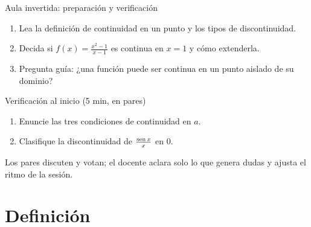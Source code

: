 \documentclass[10pt,aspectratio=169]{beamer}
\begin{document}
\begin{frame}{Aula invertida: preparación y verificación}
  \small
  \begin{previa}
    \begin{enumerate}
      \item Lea la definición de continuidad en un punto y los tipos de discontinuidad.
      \item Decida si $f(x)=\frac{x^2-1}{x-1}$ es continua en $x=1$ y cómo extenderla.
      \item Pregunta guía: ¿una función puede ser continua en un punto aislado de su dominio?
    \end{enumerate}
  \end{previa}
  \begin{block}{Verificación al inicio (5 min, en pares)}
    \begin{enumerate}
      \item Enuncie las tres condiciones de continuidad en $a$.
      \item Clasifique la discontinuidad de $\frac{\operatorname{sen} x}{x}$ en $0$.
    \end{enumerate}
    Los pares discuten y votan; el docente aclara solo lo que genera dudas y ajusta el ritmo de la sesión.
  \end{block}
\end{frame}

\section{Definición}
\end{document}
